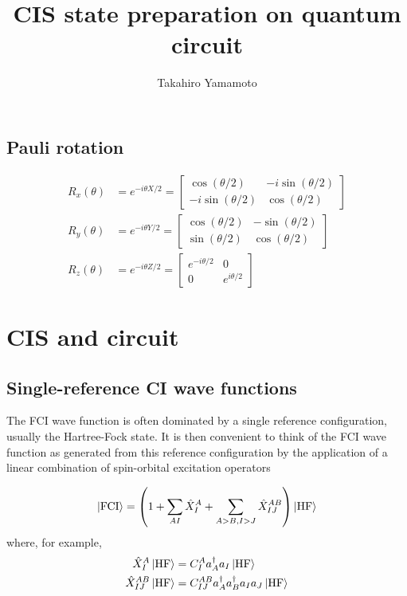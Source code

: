 \documentclass[11pt, oneside]{article}   	%
\title{CIS state preparation on quantum circuit}
\author{Takahiro Yamamoto}
\begin{document}
\maketitle

\subsection{Pauli rotation}
\begin{align}
R_x(\theta) &= e^{-i \theta X/2} = 
\begin{bmatrix}
\cos(\theta/2) & -i \sin(\theta/2) \\
-i \sin(\theta/2) & \cos(\theta/2)
\end{bmatrix} \\
R_y(\theta) &= e^{-i \theta Y/2} = 
\begin{bmatrix}
\cos(\theta/2) & -\sin(\theta/2) \\
\sin(\theta/2) & \cos(\theta/2)
\end{bmatrix} \\
R_z(\theta) &= e^{-i \theta Z/2} = 
\begin{bmatrix}
e^{-i \theta/2} & 0 \\
0 & e^{i \theta/2}
\end{bmatrix}
\end{align}

\section{CIS and circuit}
\subsection{Single-reference CI wave functions}
The FCI wave function is often dominated by a single reference configuration, usually the Hartree-Fock state.
It is then convenient to think of the FCI wave function as generated from this reference configuration by the application of a linear combination of spin-orbital excitation operators

\begin{equation}
\ket{\text{FCI}} = \left( 1 + \sum_{AI} \hat{X}^A_I + \sum_{A>B, I>J} \hat{X}^{AB}_{IJ} \right) \ket{\text{HF}} 
\end{equation}
where, for example,
\begin{align}
\hat{X}^A_I \ket{\text{HF}} &= C^A_I a^{\dagger}_A a_I \ket{\text{HF}} \\
\hat{X}^{AB}_{IJ} \ket{\text{HF}} &= C^{AB}_{IJ} a^{\dagger}_A a^{\dagger}_B a_I a_J \ket{\text{HF}} 
\end{align}
\end{document}
